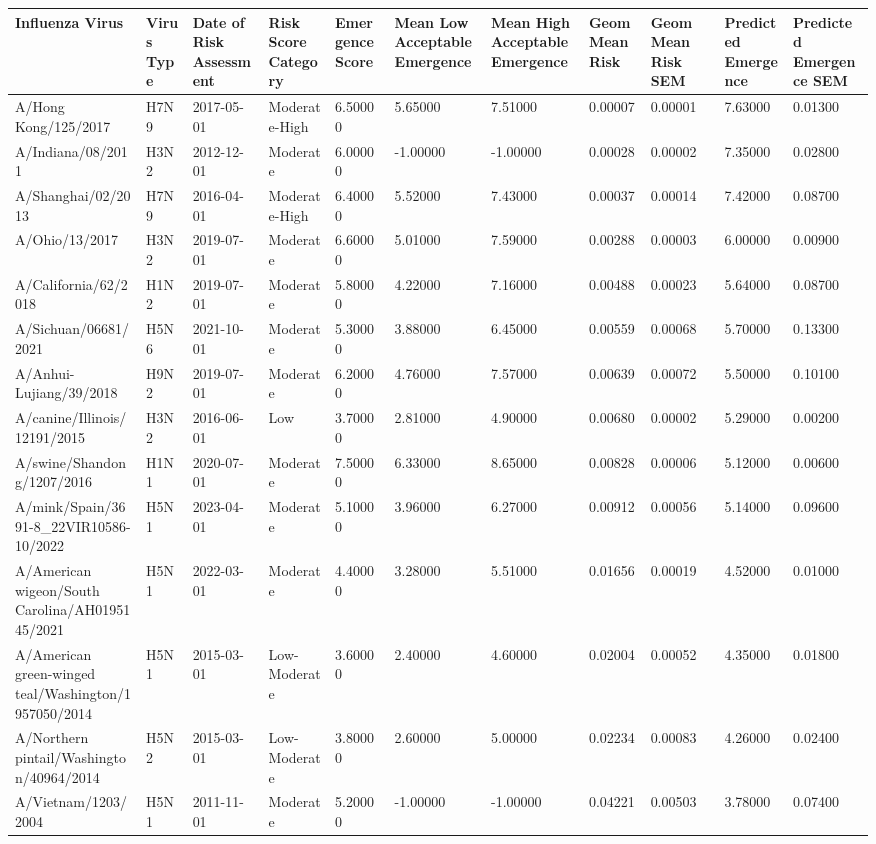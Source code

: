 \begin{tabular}{L{1in}|L{1in}|L{1in}|L{1in}|L{1in}|L{1in}|L{1in}|L{1in}|L{1in}|L{1in}|L{1in}}\hline
 Influenza  Virus & Virus  Type & Date  of  Risk  Assessment & Risk  Score  Category & Emergence  Score & Mean  Low  Acceptable  Emergence & Mean  High  Acceptable  Emergence & Geom  Mean  Risk & Geom  Mean  Risk  SEM & Predicted  Emergence & Predicted  Emergence  SEM \\\hline
 A/Hong  Kong/125/2017 &H7N9&2017-05-01& Moderate-High &6.50000&5.65000&7.51000&0.00007&0.00001&7.63000&0.01300\\\hline
 A/Indiana/08/2011 &H3N2&2012-12-01& Moderate &6.00000&-1.00000&-1.00000&0.00028&0.00002&7.35000&0.02800\\\hline
 A/Shanghai/02/2013 &H7N9&2016-04-01& Moderate-High &6.40000&5.52000&7.43000&0.00037&0.00014&7.42000&0.08700\\\hline
 A/Ohio/13/2017 &H3N2&2019-07-01& Moderate &6.60000&5.01000&7.59000&0.00288&0.00003&6.00000&0.00900\\\hline
 A/California/62/2018 &H1N2&2019-07-01& Moderate &5.80000&4.22000&7.16000&0.00488&0.00023&5.64000&0.08700\\\hline
 A/Sichuan/06681/2021 &H5N6&2021-10-01& Moderate &5.30000&3.88000&6.45000&0.00559&0.00068&5.70000&0.13300\\\hline
 A/Anhui-Lujiang/39/2018 &H9N2&2019-07-01& Moderate &6.20000&4.76000&7.57000&0.00639&0.00072&5.50000&0.10100\\\hline
 A/canine/Illinois/12191/2015 &H3N2&2016-06-01&Low&3.70000&2.81000&4.90000&0.00680&0.00002&5.29000&0.00200\\\hline
 A/swine/Shandong/1207/2016 &H1N1&2020-07-01& Moderate &7.50000&6.33000&8.65000&0.00828&0.00006&5.12000&0.00600\\\hline
 A/mink/Spain/3691-8\_22VIR10586-10/2022 &H5N1&2023-04-01& Moderate &5.10000&3.96000&6.27000&0.00912&0.00056&5.14000&0.09600\\\hline
 A/American  wigeon/South  Carolina/AH0195145/2021 &H5N1&2022-03-01& Moderate &4.40000&3.28000&5.51000&0.01656&0.00019&4.52000&0.01000\\\hline
 A/American  green-winged  teal/Washington/1957050/2014 &H5N1&2015-03-01& Low-Moderate &3.60000&2.40000&4.60000&0.02004&0.00052&4.35000&0.01800\\\hline
 A/Northern  pintail/Washington/40964/2014 &H5N2&2015-03-01& Low-Moderate &3.80000&2.60000&5.00000&0.02234&0.00083&4.26000&0.02400\\\hline
 A/Vietnam/1203/2004 &H5N1&2011-11-01& Moderate &5.20000&-1.00000&-1.00000&0.04221&0.00503&3.78000&0.07400\\\hline

\end{tabular}
